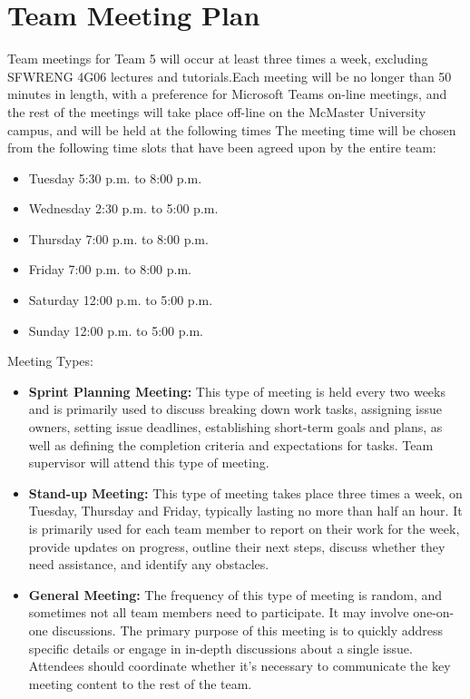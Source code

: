 \documentclass{article}
\begin{document}
\section{Team Meeting Plan}
Team meetings for Team 5 will occur at least three times a week, excluding SFWRENG 4G06 lectures and tutorials.Each meeting will be no longer than 50 minutes in length, with a preference for Microsoft Teams on-line meetings, and the rest of the meetings will take place off-line on the McMaster University campus, and will be held at the following times The meeting time will be chosen from the following time slots that have been agreed upon by the entire team: 
\begin{itemize}
    \item Tuesday 5:30 p.m. to 8:00 p.m.
    \item Wednesday 2:30 p.m. to 5:00 p.m.
    \item Thursday 7:00 p.m. to 8:00 p.m.
    \item Friday 7:00 p.m. to 8:00 p.m.
    \item Saturday 12:00 p.m. to 5:00 p.m.
    \item Sunday 12:00 p.m. to 5:00 p.m.
\end{itemize}
Meeting Types:
\begin{itemize}
    \item \textbf{Sprint Planning Meeting:} 
    This type of meeting is held every two weeks and is primarily used to discuss breaking down work tasks, assigning issue owners, setting issue deadlines, establishing short-term goals and plans, as well as defining the completion criteria and expectations for tasks. Team supervisor will attend this type of meeting.
    \item \textbf{Stand-up Meeting:}
   	This type of meeting takes place three times a week, on Tuesday, Thursday and Friday, typically lasting no more than half an hour. It is primarily used for each team member to report on their work for the week, provide updates on progress, outline their next steps, discuss whether they need assistance, and identify any obstacles.
    \item \textbf{General Meeting:}
    The frequency of this type of meeting is random, and sometimes not all team members need to participate. It may involve one-on-one discussions. The primary purpose of this meeting is to quickly address specific details or engage in in-depth discussions about a single issue. Attendees should coordinate whether it's necessary to communicate the key meeting content to the rest of the team.
\end{itemize}
\end{document}
